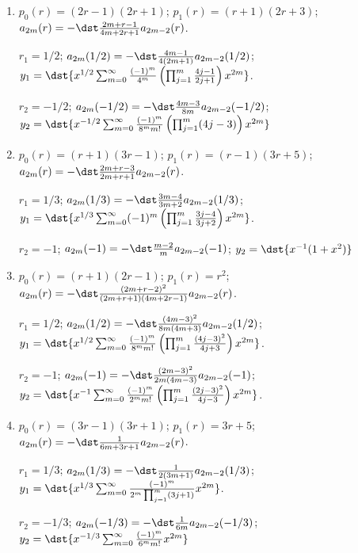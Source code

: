 \documentclass[openany]{book}
\newenvironment{sectionSolutions}{
 \begin{enumerate}[item-label={\thesection.\arabic{enumi}.}]
}{
 \end{enumerate}
}
\begin{document}
\begin{sectionSolutions}
$r_1=1/2$;
$a_{2m}(1/2)=\dst\frac{4m-1}{8m}a_{2m-2}(1/2)$;
$y_1=\dst{x^{1/2}\sum_{m=0}^\infty\frac{1}{8^mm!}\left(\prod_{j=1}^m(4j-1)
 \right)x^{2m}}$.

$r_2=1/3$;
$a_{2m}(1/3)=\dst\frac{6m-2}{12m-1}a_{2m-2}(1/3)$;
$y_2=\dst{x^{1/3}\sum_{m=0}^\infty2^m\left(\prod_{j=1}^m\frac{3j-1}{12j-1}
\right) x^{2m}}$.


\item
$p_0(r)=(2r-1)(2r+1)$;
$p_1(r)=(r+1)(2r+3)$;
$a_{2m}(r)=-\dst\frac{2m+r-1}{4m+2r+1}a_{2m-2}(r)$.

$r_1=1/2$;
$a_{2m}(1/2)=-\dst\frac{4m-1}{4(2m+1)}a_{2m-2}(1/2)$;
$y_1=\dst{x^{1/2}\sum_{m=0}^\infty\frac{(-1)^m}{4^m}\left(\prod_{j=1}^m
\frac{4j-1}{2j+1}\right)x^{2m}}$.

$r_2=-1/2$;
$a_{2m}(-1/2)=-\dst\frac{4m-3}{8m}a_{2m-2}(-1/2)$;
$y_2=\dst{x^{-1/2}\sum_{m=0}^\infty\frac{(-1)^m}{8^mm!}\left(\prod_{j=1}^m
(4j-3)\right)x^{2m}}$


\item
$p_0(r)=(r+1)(3r-1)$;
$p_1(r)=(r-1)(3r+5)$;
$a_{2m}(r)=-\dst\frac{2m+r-3}{2m+r+1}a_{2m-2}(r)$.

$r_1=1/3$;
$a_{2m}(1/3)=-\dst\frac{3m-4}{3m+2}a_{2m-2}(1/3)$;
$y_1=\dst{x^{1/3}\sum_{m=0}^\infty(-1)^m\left(\prod_{j=1}^m
\frac{3j-4}{3j+2}\right)x^{2m}}$.

$r_2=-1$;
$a_{2m}(-1)=-\dst\frac{m-2}{ m}a_{2m-2}(-1)$;
 $y_2=\dst{x^{-1}(1+x^2)}$


\item
$p_0(r)=(r+1)(2r-1)$;
$p_1(r)=r^2$;
$a_{2m}(r)=-\dst\frac{(2m+r-2)^2}{(2m+r+1)(4m+2r-1)}a_{2m-2}(r)$.

$r_1=1/2$;
$a_{2m}(1/2)=-\dst\frac{(4m-3)^2}{8m(4m+3)}a_{2m-2}(1/2)$;
$y_1=\dst{x^{1/2}\sum_{m=0}^\infty\frac{(-1)^m}{8^mm!}\left(\prod_{j=1}^m
\frac{(4j-3)^2}{4j+3}\right)x^{2m}}$.

$r_2=-1$;
$a_{2m}(-1)=-\dst\frac{(2m-3)^2}{2m(4m-3)}a_{2m-2}(-1)$;
$y_2=\dst{x^{-1}\sum_{m=0}^\infty\frac{(-1)^m}{2^mm!}\left(\prod_{j=1}^m
\frac{(2j-3)^2}{4j-3}\right)x^{2m}}$.


\item
$p_0(r)=(3r-1)(3r+1)$;
$p_1(r)=3r+5$;
$a_{2m}(r)=-\dst\frac{1}{6m+3r+1}a_{2m-2}(r)$.

$r_1=1/3$;
$a_{2m}(1/3)=-\dst\frac{1}{2(3m+1)}a_{2m-2}(1/3)$;
$y_1=\dst{x^{1/3}\sum_{m=0}^\infty\frac{(-1)^m}{2^m\prod_{j=1}^m(3j+1)}
x^{2m}}$.

$r_2=-1/3$;
$a_{2m}(-1/3)=-\dst\frac{1}{6m}a_{2m-2}(-1/3)$;
$y_2=\dst{x^{-1/3}\sum_{m=0}^\infty\frac{(-1)^m}{6^mm!} x^{2m}}$



\end{sectionSolutions}
\end{document}

